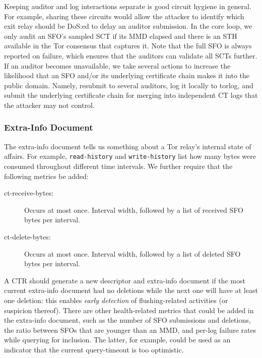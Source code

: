Keeping auditor and log interactions separate is good circuit hygiene in
general.  For example,  sharing these circuits would allow the attacker to
identify which exit relay should be DoS:ed to delay an auditor submission.
In the core loop, we only audit an SFO's sampled SCT if its MMD elapsed
and there is an STH available in the Tor consensus that captures it.  Note that
the full SFO is always reported on failure, which ensures that the auditors can
validate all SCTs further.  If an auditor becomes unavailable, we take several
actions to increase the likelihood that an SFO and/or its underlying certificate
chain makes it into the public domain.  Namely, resubmit to several auditors,
log it locally to torlog, and submit the underlying certificate chain for
merging into independent CT logs that the attacker may not control.

%
%

\subsubsection{Extra-Info Document} \label{sec:design:extra-info}
The extra-info document tells us something about a Tor relay's internal state of
affairs.  For example, \texttt{read-history} and \texttt{write-history} list how
many bytes were consumed throughout different time intervals.  We further
require that the following metrics be added:
\begin{description}
	\item[ct-receive-bytes:] Occurs at most once.  Interval width, followed by a
		list of received SFO bytes per interval.
	\item[ct-delete-bytes:] Occurs at most once.  Interval width, followed by a
		list of deleted SFO bytes per interval.
\end{description}

A CTR should generate a new descriptor and extra-info document if the most
current extra-info document had no deletions while the next one will have at
least one deletion:
	this enables \emph{early detection} of flushing-related activities
	(or suspicion thereof).
There are other health-related metrics that could be added in the
extra-info document, such as
	the number of SFO submissions and deletions,
	the ratio between SFOs that are younger than an MMD, and
	per-log failure rates while querying for inclusion.
The latter, for example, could be used as an indicator that the current
query-timeout is too optimistic.

